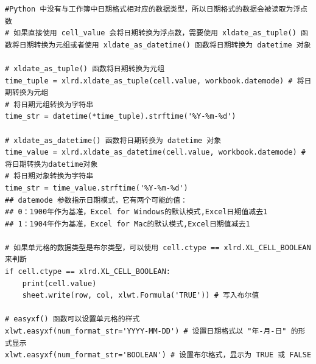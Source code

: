 \begin{lstlisting}[style=demostyle,numbers=none]
#Python 中没有与工作簿中日期格式相对应的数据类型，所以日期格式的数据会被读取为浮点数
# 如果直接使用 cell_value 会将日期转换为浮点数，需要使用 xldate_as_tuple() 函数将日期转换为元组或者使用 xldate_as_datetime() 函数将日期转换为 datetime 对象

# xldate_as_tuple() 函数将日期转换为元组
time_tuple = xlrd.xldate_as_tuple(cell.value, workbook.datemode) # 将日期转换为元组
# 将日期元组转换为字符串
time_str = datetime(*time_tuple).strftime('%Y-%m-%d')

# xldate_as_datetime() 函数将日期转换为 datetime 对象
time_value = xlrd.xldate_as_datetime(cell.value, workbook.datemode) # 将日期转换为datetime对象
# 将日期对象转换为字符串
time_str = time_value.strftime('%Y-%m-%d')
## datemode 参数指示日期模式，它有两个可能的值：
## 0：1900年作为基准，Excel for Windows的默认模式,Excel日期值减去1
## 1：1904年作为基准，Excel for Mac的默认模式,Excel日期值减去1

# 如果单元格的数据类型是布尔类型，可以使用 cell.ctype == xlrd.XL_CELL_BOOLEAN 来判断
if cell.ctype == xlrd.XL_CELL_BOOLEAN:
    print(cell.value)
    sheet.write(row, col, xlwt.Formula('TRUE')) # 写入布尔值

# easyxf() 函数可以设置单元格的样式
xlwt.easyxf(num_format_str='YYYY-MM-DD') # 设置日期格式以 "年-月-日" 的形式显示
xlwt.easyxf(num_format_str='BOOLEAN') # 设置布尔格式，显示为 TRUE 或 FALSE

\end{lstlisting}

